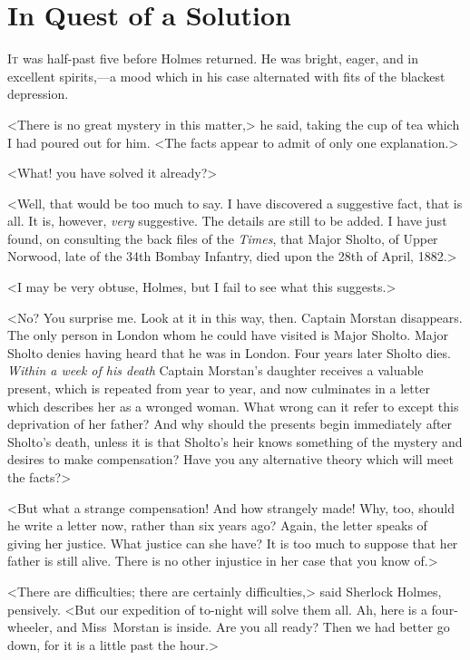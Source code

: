 \chapter{In Quest of a Solution}
\lettrine{I}{t} was half-past five before Holmes returned. He was bright, eager, and in excellent spirits,—a mood which in his case alternated with fits of the blackest depression.

\zz
<There is no great mystery in this matter,> he said, taking the cup of tea which I had poured out for him. <The facts appear to admit of only one explanation.>

<What! you have solved it already?>

<Well, that would be too much to say. I have discovered a suggestive fact, that is all. It is, however, \textit{very} suggestive. The details are still to be added. I have just found, on consulting the back files of the \textit{Times}, that Major Sholto, of Upper Norwood, late of the 34th Bombay Infantry, died upon the 28th of April, 1882.>

<I may be very obtuse, Holmes, but I fail to see what this suggests.>

<No? You surprise me. Look at it in this way, then. Captain Morstan disappears. The only person in London whom he could have visited is Major Sholto. Major Sholto denies having heard that he was in London. Four years later Sholto dies. \textit{Within a week of his death} Captain Morstan's daughter receives a valuable present, which is repeated from year to year, and now culminates in a letter which describes her as a wronged woman. What wrong can it refer to except this deprivation of her father? And why should the presents begin immediately after Sholto's death, unless it is that Sholto's heir knows something of the mystery and desires to make compensation? Have you any alternative theory which will meet the facts?>

<But what a strange compensation! And how strangely made! Why, too, should he write a letter now, rather than six years ago? Again, the letter speaks of giving her justice. What justice can she have? It is too much to suppose that her father is still alive. There is no other injustice in her case that you know of.>

<There are difficulties; there are certainly difficulties,> said Sherlock Holmes, pensively. <But our expedition of to-night will solve them all. Ah, here is a four-wheeler, and Miss~Morstan is inside. Are you all ready? Then we had better go down, for it is a little past the hour.>

